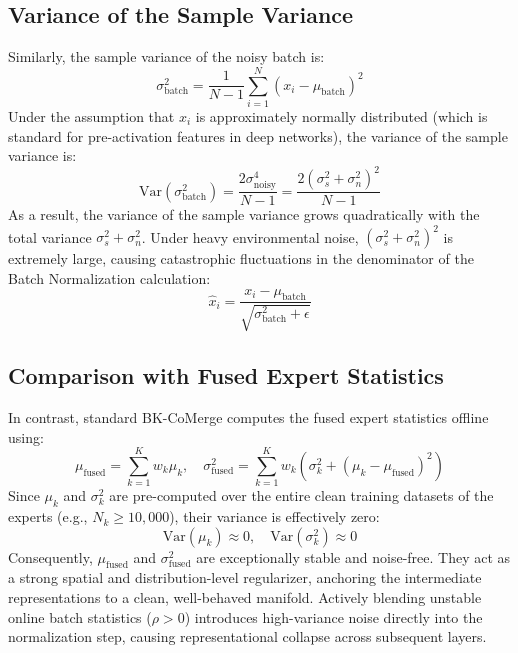 \documentclass{article}
\theoremstyle{plain}
\theoremstyle{definition}
\theoremstyle{remark}
\begin{document}
\subsection{Variance of the Sample Variance}
Similarly, the sample variance of the noisy batch is:
\begin{equation}
    \sigma^2_{\text{batch}} = \frac{1}{N-1} \sum_{i=1}^N (x_i - \mu_{\text{batch}})^2
\end{equation}
Under the assumption that $x_i$ is approximately normally distributed (which is standard for pre-activation features in deep networks), the variance of the sample variance is:
\begin{equation}
    \text{Var}(\sigma^2_{\text{batch}}) = \frac{2 \sigma^4_{\text{noisy}}}{N-1} = \frac{2 (\sigma^2_s + \sigma^2_n)^2}{N-1}
\end{equation}
As a result, the variance of the sample variance grows quadratically with the total variance $\sigma^2_s + \sigma^2_n$. Under heavy environmental noise, $(\sigma^2_s + \sigma^2_n)^2$ is extremely large, causing catastrophic fluctuations in the denominator of the Batch Normalization calculation:
\begin{equation}
    \hat{x}_i = \frac{x_i - \mu_{\text{batch}}}{\sqrt{\sigma^2_{\text{batch}} + \epsilon}}
\end{equation}

\subsection{Comparison with Fused Expert Statistics}
In contrast, standard BK-CoMerge computes the fused expert statistics offline using:
\begin{equation}
    \mu_{\text{fused}} = \sum_{k=1}^K w_k \mu_k, \quad \sigma^2_{\text{fused}} = \sum_{k=1}^K w_k \left( \sigma^2_k + (\mu_k - \mu_{\text{fused}})^2 \right)
\end{equation}
Since $\mu_k$ and $\sigma^2_k$ are pre-computed over the entire clean training datasets of the experts (e.g., $N_k \ge 10{,}000$), their variance is effectively zero:
\begin{equation}
    \text{Var}(\mu_k) \approx 0, \quad \text{Var}(\sigma^2_k) \approx 0
\end{equation}
Consequently, $\mu_{\text{fused}}$ and $\sigma^2_{\text{fused}}$ are exceptionally stable and noise-free. They act as a strong spatial and distribution-level regularizer, anchoring the intermediate representations to a clean, well-behaved manifold. Actively blending unstable online batch statistics ($\rho > 0$) introduces high-variance noise directly into the normalization step, causing representational collapse across subsequent layers.
\end{document}
